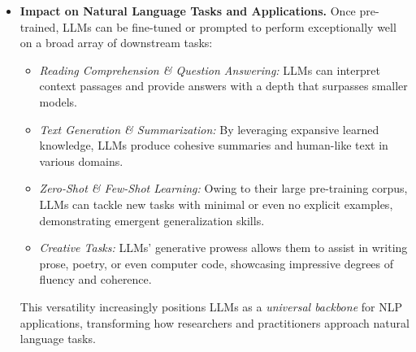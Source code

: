\begin{itemize}
    \item \textbf{Impact on Natural Language Tasks and Applications.}
    Once pre-trained, LLMs can be fine-tuned or prompted to perform exceptionally well on a broad array of downstream tasks:
    \begin{itemize}[noitemsep]
        \item \textit{Reading Comprehension \& Question Answering:} LLMs can interpret context passages and provide answers with a depth that surpasses smaller models.
        \item \textit{Text Generation \& Summarization:} By leveraging expansive learned knowledge, LLMs produce cohesive summaries and human-like text in various domains.
        \item \textit{Zero-Shot \& Few-Shot Learning:} Owing to their large pre-training corpus, LLMs can tackle new tasks with minimal or even no explicit examples, demonstrating emergent generalization skills.
        \item \textit{Creative Tasks:} LLMs' generative prowess allows them to assist in writing prose, poetry, or even computer code, showcasing impressive degrees of fluency and coherence.
    \end{itemize}
    This versatility increasingly positions LLMs as a \emph{universal backbone} for NLP applications, transforming how researchers and practitioners approach natural language tasks.


\end{itemize}
